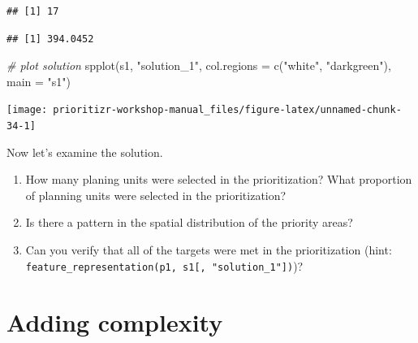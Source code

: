 \documentclass[
  12pt,
]{book}
\makeatletter
\newenvironment{Shaded}{\begin{snugshade}}{\end{snugshade}}
\newcommand{\AttributeTok}[1]{\textcolor[rgb]{0.77,0.63,0.00}{#1}}
\newcommand{\CommentTok}[1]{\textcolor[rgb]{0.56,0.35,0.01}{\textit{#1}}}
\newcommand{\FunctionTok}[1]{\textcolor[rgb]{0.00,0.00,0.00}{#1}}
\newcommand{\NormalTok}[1]{#1}
\newcommand{\SpecialCharTok}[1]{\textcolor[rgb]{0.00,0.00,0.00}{#1}}
\newcommand{\StringTok}[1]{\textcolor[rgb]{0.31,0.60,0.02}{#1}}
\providecommand{\tightlist}{%
  \setlength{\itemsep}{0pt}\setlength{\parskip}{0pt}}
\newenvironment{kframe}{%
\medskip{}
\setlength{\fboxsep}{.8em}
 \def\at@end@of@kframe{}%
 \ifinner\ifhmode%
  \def\at@end@of@kframe{\end{minipage}}%
  \begin{minipage}{\columnwidth}%
 \fi\fi%
 \def\FrameCommand##1{\hskip\@totalleftmargin \hskip-\fboxsep
 \colorbox{shadecolor}{##1}\hskip-\fboxsep
     \hskip-\linewidth \hskip-\@totalleftmargin \hskip\columnwidth}%
 \MakeFramed {\advance\hsize-\width
   \@totalleftmargin\z@ \linewidth\hsize
   \@setminipage}}%
 {\par\unskip\endMakeFramed%
 \at@end@of@kframe}
\newenvironment{rmdblock}[1]
  {
  \begin{itemize}
  \renewcommand{\labelitemi}{
    \raisebox{-.7\height}[0pt][0pt]{
      {\setkeys{Gin}{width=3em,keepaspectratio}\texttt{[image: images/\#1]}}
    }
  }
  \setlength{\fboxsep}{1em}
  \begin{kframe}
  \item
  }
  {
  \end{kframe}
  \end{itemize}
  }
\newenvironment{rmdquestion}
  {\begin{rmdblock}{question}}
  {\end{rmdblock}}
\makeatother
\begin{document}
\begin{verbatim}
## [1] 17
\end{verbatim}

\begin{Shaded}
\end{Shaded}

\begin{verbatim}
## [1] 394.0452
\end{verbatim}

\begin{Shaded}
\begin{Highlighting}[]
\CommentTok{\# plot solution}
\FunctionTok{spplot}\NormalTok{(s1, }\StringTok{"solution\_1"}\NormalTok{, }\AttributeTok{col.regions =} \FunctionTok{c}\NormalTok{(}\StringTok{"white"}\NormalTok{, }\StringTok{"darkgreen"}\NormalTok{), }\AttributeTok{main =} \StringTok{"s1"}\NormalTok{)}
\end{Highlighting}
\end{Shaded}

\begin{center}\texttt{[image: prioritizr-workshop-manual\_files/figure-latex/unnamed-chunk-34-1]} \end{center}

Now let's examine the solution.

\begin{rmdquestion}
\begin{enumerate}
\def\labelenumi{\arabic{enumi}.}
\tightlist
\item
  How many planing units were selected in the prioritization? What proportion of planning units were selected in the prioritization?
\item
  Is there a pattern in the spatial distribution of the priority areas?
\item
  Can you verify that all of the targets were met in the prioritization (hint: \texttt{feature\_representation(p1,\ s1{[},\ "solution\_1"{]})})?
\end{enumerate}
\end{rmdquestion}

\hypertarget{adding-complexity}{%
\section{Adding complexity}\label{adding-complexity}}
\end{document}
